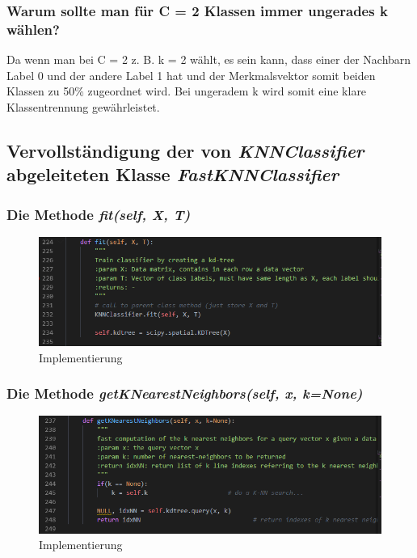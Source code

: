 \subsubsection{Warum sollte man für C = 2 Klassen immer ungerades k wählen?}

Da wenn man bei C = 2 z. B. k = 2 wählt, es sein kann, dass einer der Nachbarn Label 0 und der andere Label 1 hat und der Merkmalsvektor somit beiden Klassen zu 50\% zugeordnet wird. Bei ungeradem k wird somit eine klare Klassentrennung
gewährleistet.

\subsection{Vervollständigung der von \textit{KNNClassifier} abgeleiteten Klasse \textit{FastKNNClassifier}}

\subsubsection{Die Methode \textit{fit(self, X, T)}}

\begin{figure}[H]
    \centering
    \includegraphics[width=1\linewidth]{files/aufgabe2d1.png}
    \caption{Implementierung}
\end{figure}

\subsubsection{Die Methode \textit{getKNearestNeighbors(self, x, k=None)}}

\begin{figure}[H]
    \centering
    \includegraphics[width=1\linewidth]{files/aufgabe2d2.png}
    \caption{Implementierung}
\end{figure}

